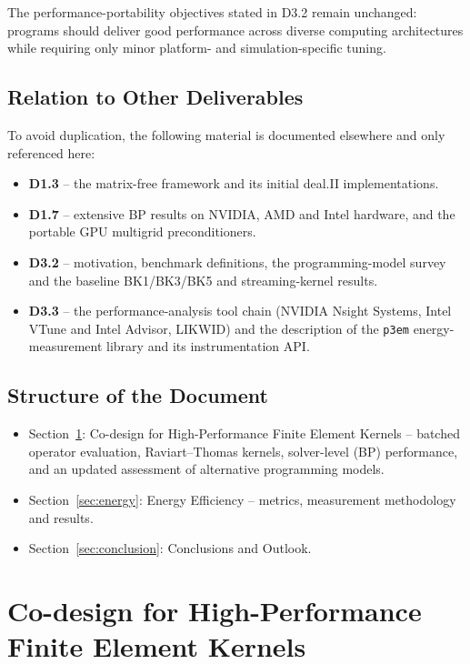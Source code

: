 \documentclass[a4paper,12pt]{article}
\begin{document}
The performance-portability objectives stated in D3.2 remain unchanged: programs should deliver good performance across diverse computing architectures while requiring only minor platform- and simulation-specific tuning.

\subsection{Relation to Other Deliverables}

To avoid duplication, the following material is documented elsewhere and only referenced here:

\begin{itemize}
    \item \textbf{D1.3} -- the matrix-free framework and its initial deal.II implementations.
    \item \textbf{D1.7} -- extensive BP results on NVIDIA, AMD and Intel hardware, and the portable GPU multigrid preconditioners.
    \item \textbf{D3.2} -- motivation, benchmark definitions, the programming-model survey and the baseline BK1/BK3/BK5 and streaming-kernel results.
    \item \textbf{D3.3} -- the performance-analysis tool chain (NVIDIA Nsight Systems, Intel VTune and Intel Advisor, LIKWID) and the description of the \texttt{p3em} energy-measurement library and its instrumentation API.
\end{itemize}

\subsection{Structure of the Document}

\begin{itemize}
    \item Section~\ref{sec:codesign}: Co-design for High-Performance Finite Element Kernels -- batched operator evaluation, Raviart--Thomas kernels, solver-level (BP) performance, and an updated assessment of alternative programming models.
    \item Section~\ref{sec:energy}: Energy Efficiency -- metrics, measurement methodology and results.
    \item Section~\ref{sec:conclusion}: Conclusions and Outlook.
\end{itemize}

\newpage

\section{{Co-design for High-Performance Finite Element Kernels}}
\label{sec:codesign}
\end{document}
